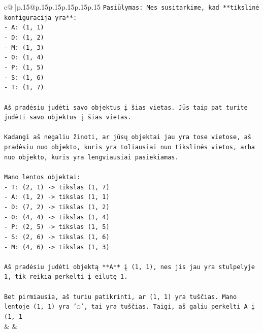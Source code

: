 \documentclass{article}
\begin{document}
{\begin{supertabular}{c@{$\;$}|p{.15\linewidth}@{}p{.15\linewidth}p{.15\linewidth}p{.15\linewidth}p{.15\linewidth}p{.15\linewidth}}
{{{\texttt{Pasiūlymas: Mes susitarkime, kad **tikslinė konfigūracija yra**:} \\
\texttt{{-} A: (1, 1)} \\
\texttt{{-} D: (1, 2)} \\
\texttt{{-} M: (1, 3)} \\
\texttt{{-} O: (1, 4)} \\
\texttt{{-} P: (1, 5)} \\
\texttt{{-} S: (1, 6)} \\
\texttt{{-} T: (1, 7)} \\
\\ 
\texttt{Aš pradėsiu judėti savo objektus į šias vietas. Jūs taip pat turite judėti savo objektus į šias vietas.} \\
\\ 
\texttt{Kadangi aš negaliu žinoti, ar jūsų objektai jau yra tose vietose, aš pradėsiu nuo objekto, kuris yra toliausiai nuo tikslinės vietos, arba nuo objekto, kuris yra lengviausiai pasiekiamas.} \\
\\ 
\texttt{Mano lentos objektai:} \\
\texttt{{-} T: (2, 1) {-}> tikslas (1, 7)} \\
\texttt{{-} A: (1, 2) {-}> tikslas (1, 1)} \\
\texttt{{-} D: (7, 2) {-}> tikslas (1, 2)} \\
\texttt{{-} O: (4, 4) {-}> tikslas (1, 4)} \\
\texttt{{-} P: (2, 5) {-}> tikslas (1, 5)} \\
\texttt{{-} S: (2, 6) {-}> tikslas (1, 6)} \\
\texttt{{-} M: (4, 6) {-}> tikslas (1, 3)} \\
\\ 
\texttt{Aš pradėsiu judėti objektą **A** į (1, 1), nes jis jau yra stulpelyje 1, tik reikia perkelti į eilutę 1.} \\
\\ 
\texttt{Bet pirmiausia, aš turiu patikrinti, ar (1, 1) yra tuščias. Mano lentoje (1, 1) yra '◌', tai yra tuščias. Taigi, aš galiu perkelti A į (1, 1} \\
            }
        }
    }
    & & \\ \\


\end{supertabular}}
\end{document}
